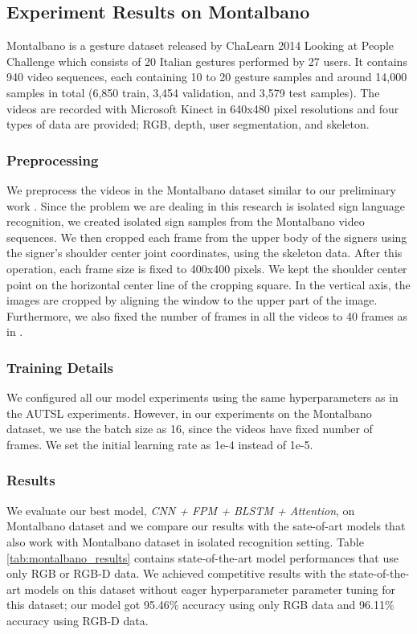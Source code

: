 \documentclass[11pt, a4paper, singlecolumn]{article}
\begin{document}
\subsection{Experiment Results on Montalbano}
\label{sec:results_montalbano}

Montalbano is a gesture dataset released by ChaLearn 2014 Looking at People Challenge which consists of 20 Italian gestures performed by 27 users. It contains 940 video sequences, each containing 10 to 20 gesture samples and around 14,000 samples in total (6,850 train, 3,454 validation, and 3,579 test samples). The videos are recorded with Microsoft Kinect in 640x480 pixel resolutions and four types of data are provided; RGB, depth, user segmentation, and skeleton.

\subsubsection{Preprocessing}
\label{sec:preprocessing}
We preprocess the videos in the Montalbano dataset similar to our preliminary work \cite{sincan2019isolated}. Since the problem we are dealing in this research is isolated sign language recognition, we created isolated sign samples from the Montalbano video sequences. We then cropped each frame from the upper body of the signers using the signer's shoulder center joint coordinates, using the skeleton data. After this operation, each frame size is fixed to 400x400 pixels. We kept the shoulder center point on the horizontal center line of the cropping square. In the vertical axis, the images are cropped by aligning the window to the upper part of the image. Furthermore, we also fixed the number of frames in all the videos to 40 frames as in \cite{sincan2019isolated}. 

\subsubsection{Training Details}
\label{sec:trainingDetails_montalbano}

We configured all our model experiments using the same hyperparameters as in the AUTSL experiments. However, in our experiments on the Montalbano dataset, we use the batch size as 16, since the videos have fixed number of frames. We set the initial learning rate as 1e-4 instead of 1e-5.

\subsubsection{Results}
We evaluate our best model, \textit{CNN + FPM + BLSTM + Attention}, on Montalbano dataset and we compare our results with the sate-of-art models that also work with Montalbano dataset in isolated recognition setting. Table \ref{tab:montalbano_results}  contains state-of-the-art model performances that use only RGB or RGB-D data. We achieved competitive results with the state-of-the-art models on this dataset without eager hyperparameter parameter tuning for this dataset; our model got 95.46\% accuracy using only RGB data and 96.11\% accuracy using RGB-D data.
\end{document}
